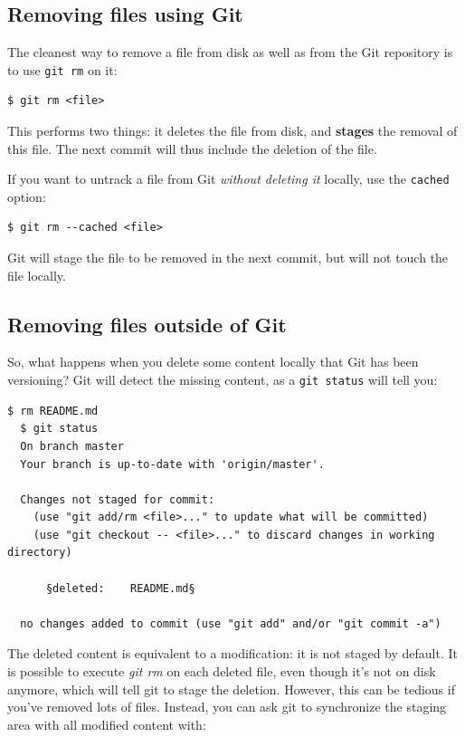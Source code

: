 \documentclass{../common/tufte-latex/tufte-handout}
\begin{document}
\subsection{Removing files using Git}

The cleanest way to remove a file from disk as well as from the Git repository is to use \texttt{git rm} on it:

\begin{lstlisting}[style=BashInputStyle]
  $ git rm <file>
\end{lstlisting}

This performs two things: it deletes the file from disk, and \textbf{stages} the removal of this file.
The next commit will thus include the deletion of the file.

If you want to untrack a file from Git \textit{without deleting it} locally, use the \texttt{cached} option:

\begin{lstlisting}[style=BashInputStyle]
  $ git rm --cached <file>
\end{lstlisting}

Git will stage the file to be removed in the next commit, but will not touch the file locally.

\subsection{Removing files outside of Git}

So, what happens when you delete some content locally that Git has been versioning?
Git will detect the missing content, as a \texttt{git status} will tell you:

\begin{lstlisting}[style=BashInputStyle]
  $ rm README.md
  $ git status
  On branch master
  Your branch is up-to-date with 'origin/master'.

  Changes not staged for commit:
    (use "git add/rm <file>..." to update what will be committed)
    (use "git checkout -- <file>..." to discard changes in working directory)

      §deleted:    README.md§

  no changes added to commit (use "git add" and/or "git commit -a")
\end{lstlisting}

The deleted content is equivalent to a modification: it is not staged by default.
It is possible to execute \textit{git rm} on each deleted file, even though it's not on disk anymore, which will tell git to stage the deletion.
However, this can be tedious if you've removed lots of files.
Instead, you can ask git to synchronize the staging area with all modified content with:
\end{document}
